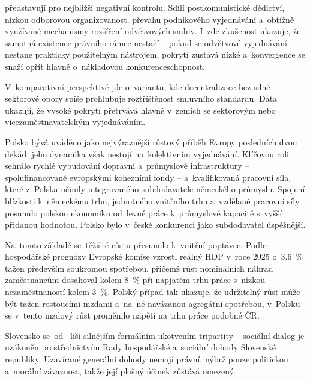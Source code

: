 představují pro  nejbližší negativní kontrolu. Sdílí postkomunistické dědictví, nízkou odborovou organizovanost, převahu podnikového vyjednávání a~obtížně využívané mechanismy rozšíření odvětvových smluv. I~zde zkušenost ukazuje, že samotná existence právního rámce nestačí -- pokud se odvětvové vyjednávání nestane prakticky použitelným nástrojem, pokrytí  zůstává nízké a~konvergence se snaží opřít hlavně o~nákladovou konkurenceschopnost.\par

V~komparativní perspektivě jde o~variantu, kde decentralizace  bez silné sektorové opory spíše prohlubuje roztříštěnost smluvního standardu. Data  ukazují, že vysoké pokrytí přetrvává hlavně v~zemích se sektorovým nebo vícezaměstnavatelským vyjednáváním.~\cite{OECD_UnionEmployerCoverage_2025}~\cite{Hala_SystemySocialnihoDialogu2013}\par

Polsko bývá uváděno jako nejvýraznější růstový příběh Evropy posledních dvou dekád, jeho dynamika však nestojí na~kolektivním vyjednávání. Klíčovou roli sehrálo rychlé vybudování dopravní a~průmyslové infrastruktury -- spolufinancované evropskými kohezními fondy -- a~kvalifikovaná pracovní síla, které z~Polska učinily integrovaného subdodavatele německého průmyslu. Spojení blízkosti k~německému trhu, jednotného vnitřního trhu  a~vzdělané pracovní síly posunulo polskou ekonomiku od~levné práce k~průmyslové kapacitě s~vyšší přidanou hodnotou. Polsko bylo v~české konkurenci jako subdodavatel úspěšnější.\par

Na~tomto základě se~těžiště růstu přesunulo k~vnitřní poptávce. Podle hospodářské prognózy Evropské komise vzrostl reálný \acs{HDP} v~roce 2025 o~\SI{3,6}{\percent} tažen především soukromou spotřebou, přičemž růst nominálních náhrad zaměstnancům dosahoval kolem \SI{8}{\percent} při napjatém trhu práce s~nízkou nezaměstnaností kolem \SI{3}{\percent}. Polský případ tak ukazuje, že udržitelný růst může být tažen rostoucími mzdami a~na~ně navázanou agregátní spotřebou, v~Polsku se v~tento mzdový růst proměnilo napětí na trhu práce podobné \acs{ČR}.~\cite{EC_EconomicForecast_Poland_2026}\par

Slovensko se~od~ liší silnějším formálním ukotvením tripartity -- sociální dialog je uzákoněn prostřednictvím Rady hospodářské a~sociální dohody Slovenské republiky. Uzavírané generální dohody nemají právní, nýbrž pouze politickou a~morální závaznost, takže její plošný účinek zůstává omezený.\par

